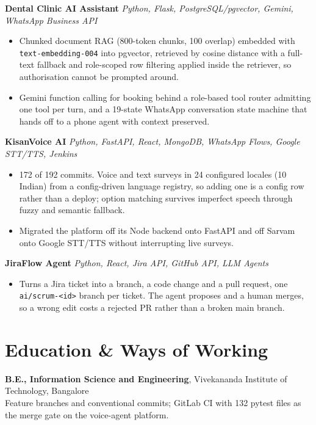 \documentclass[10pt,a4paper]{article}
\begin{document}
\vspace{1pt}
\textbf{Dental Clinic AI Assistant} \textit{Python, Flask, PostgreSQL/pgvector, Gemini, WhatsApp Business API}
\begin{itemize}
  \item Chunked document RAG (800-token chunks, 100 overlap) embedded with
        \texttt{text-embedding-004} into pgvector, retrieved by cosine distance with a full-text
        fallback and role-scoped row filtering applied inside the retriever, so authorisation cannot
        be prompted around.
  \item Gemini function calling for booking behind a role-based tool router admitting one tool per
        turn, and a 19-state WhatsApp conversation state machine that hands off to a phone agent with
        context preserved.
\end{itemize}

\vspace{1pt}
\textbf{KisanVoice AI} \textit{Python, FastAPI, React, MongoDB, WhatsApp Flows, Google STT/TTS, Jenkins}
\begin{itemize}
  \item 172 of 192 commits. Voice and text surveys in 24 configured locales (10 Indian) from a
        config-driven language registry, so adding one is a config row rather than a deploy; option
        matching survives imperfect speech through fuzzy and semantic fallback.
  \item Migrated the platform off its Node backend onto FastAPI and off Sarvam onto Google STT/TTS
        without interrupting live surveys.
\end{itemize}

\vspace{1pt}
\textbf{JiraFlow Agent} \textit{Python, React, Jira API, GitHub API, LLM Agents}
\begin{itemize}
  \item Turns a Jira ticket into a branch, a code change and a pull request, one
        \texttt{ai/scrum-<id>} branch per ticket. The agent proposes and a human merges, so a wrong
        edit costs a rejected PR rather than a broken main branch.
\end{itemize}

\section{Education \& Ways of Working}
\textbf{B.E., Information Science and Engineering}, Vivekananda Institute of Technology, Bangalore\\
Feature branches and conventional commits; GitLab CI with 132 pytest files as the merge gate on the
voice-agent platform.
\end{document}
